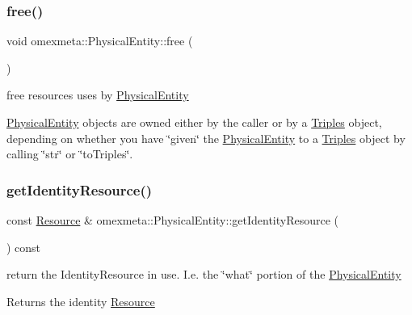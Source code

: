\subsubsection{\texorpdfstring{free()}{free()}}
{\footnotesize\ttfamily void omexmeta\+::\+Physical\+Entity\+::free (\begin{DoxyParamCaption}{ }\end{DoxyParamCaption})}



free resources uses by \hyperlink{classomexmeta_1_1PhysicalEntity}{Physical\+Entity} 

\hyperlink{classomexmeta_1_1PhysicalEntity}{Physical\+Entity} objects are owned either by the caller or by a \hyperlink{classomexmeta_1_1Triples}{Triples} object, depending on whether you have \char`\"{}given\char`\"{} the \hyperlink{classomexmeta_1_1PhysicalEntity}{Physical\+Entity} to a \hyperlink{classomexmeta_1_1Triples}{Triples} object by calling \char`\"{}str\char`\"{} or \char`\"{}to\+Triples\char`\"{}. \mbox{\label{classomexmeta_1_1PhysicalEntity_ae4b3374e9ebb817eb63f9105b491e958}} 
\subsubsection{\texorpdfstring{get\+Identity\+Resource()}{getIdentityResource()}}
{\footnotesize\ttfamily const \hyperlink{classomexmeta_1_1Resource}{Resource} \& omexmeta\+::\+Physical\+Entity\+::get\+Identity\+Resource (\begin{DoxyParamCaption}{ }\end{DoxyParamCaption}) const}



return the Identity\+Resource in use. I.\+e. the \char`\"{}what\char`\"{} portion of the \hyperlink{classomexmeta_1_1PhysicalEntity}{Physical\+Entity} 

\begin{DoxyReturn}{Returns}
the identity \hyperlink{classomexmeta_1_1Resource}{Resource} 
\end{DoxyReturn}
\mbox{\label{classomexmeta_1_1PhysicalEntity_a3e2fba07a4622db0180650d24bf263d9}} 
